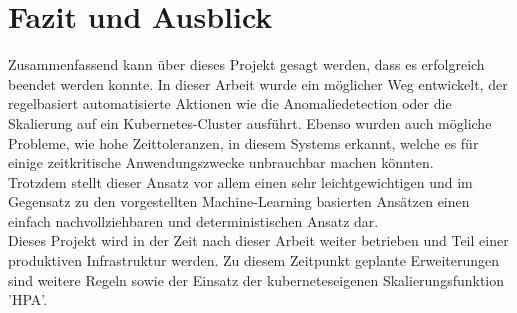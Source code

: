 \documentclass[a4paper,10pt]{scrartcl}
\begin{document}
\section{Fazit und Ausblick}

Zusammenfassend kann über dieses Projekt gesagt werden, dass es erfolgreich beendet werden konnte. In dieser Arbeit wurde ein möglicher Weg entwickelt, der regelbasiert automatisierte Aktionen wie die Anomaliedetection oder die Skalierung auf ein Kubernetes-Cluster ausführt. Ebenso wurden auch mögliche Probleme, wie hohe Zeittoleranzen, in diesem Systems erkannt, welche es für einige zeitkritische Anwendungszwecke unbrauchbar machen könnten.\\
Trotzdem stellt dieser Ansatz vor allem einen sehr leichtgewichtigen und im Gegensatz zu den vorgestellten Machine-Learning basierten Ansätzen einen einfach nachvollziehbaren und deterministischen Ansatz dar.\\
Dieses Projekt wird in der Zeit nach dieser Arbeit weiter betrieben und Teil einer produktiven Infrastruktur werden. Zu diesem Zeitpunkt geplante Erweiterungen sind weitere Regeln sowie der Einsatz der kuberneteseigenen Skalierungsfunktion 'HPA'.

\newpage

\end{document}
